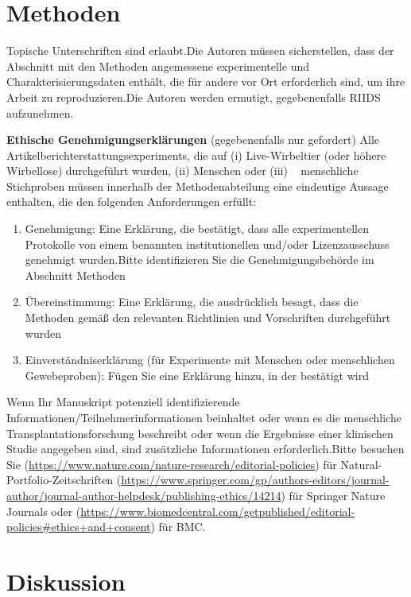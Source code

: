 \documentclass[pdflatex,sn-mathphys-num]{sn-jnl}%
\theoremstyle{thmstyleone}%
\theoremstyle{thmstyletwo}%
\theoremstyle{thmstylethree}%
\begin{document}
\section{Methoden} \label{sec11}

Topische Unterschriften sind erlaubt.Die Autoren müssen sicherstellen, dass der Abschnitt mit den Methoden angemessene experimentelle und Charakterisierungsdaten enthält, die für andere vor Ort erforderlich sind, um ihre Arbeit zu reproduzieren.Die Autoren werden ermutigt, gegebenenfalls RIIDS aufzunehmen.

\textbf{Ethische Genehmigungserklärungen} (gegebenenfalls nur gefordert) Alle Artikelberichterstattungsexperiments, die auf (i) Live-Wirbeltier (oder höhere Wirbellose) durchgeführt wurden, (ii) Menschen oder (iii) ~ menschliche Stichproben müssen innerhalb der Methodenabteilung eine eindeutige Aussage enthalten, die den folgenden Anforderungen erfüllt:

\begin{enumerate}[1.]
\item Genehmigung: Eine Erklärung, die bestätigt, dass alle experimentellen Protokolle von einem benannten institutionellen und/oder Lizenzausschuss genehmigt wurden.Bitte identifizieren Sie die Genehmigungsbehörde im Abschnitt Methoden

\item Übereinstimmung: Eine Erklärung, die ausdrücklich besagt, dass die Methoden gemäß den relevanten Richtlinien und Vorschriften durchgeführt wurden

\item Einverständniserklärung (für Experimente mit Menschen oder menschlichen Gewebeproben): Fügen Sie eine Erklärung hinzu, in der bestätigt wird
\end{enumerate}

Wenn Ihr Manuskript potenziell identifizierende Informationen/Teilnehmerinformationen beinhaltet oder wenn es die menschliche Transplantationsforschung beschreibt oder wenn die Ergebnisse einer klinischen Studie angegeben sind, sind zusätzliche Informationen erforderlich.Bitte besuchen Sie (\url{https://www.nature.com/nature-research/editorial-policies}) für Natural-Portfolio-Zeitschriften (\url{https://www.springer.com/gp/authors-editors/journal-author/journal-author-helpdesk/publishing-ethics/14214}) für Springer Nature Journals oder (\url{https://www.biomedcentral.com/getpublished/editorial-policies\#ethics+and+consent}) für BMC.

\section{Diskussion} \label{sec12}
\end{document}
